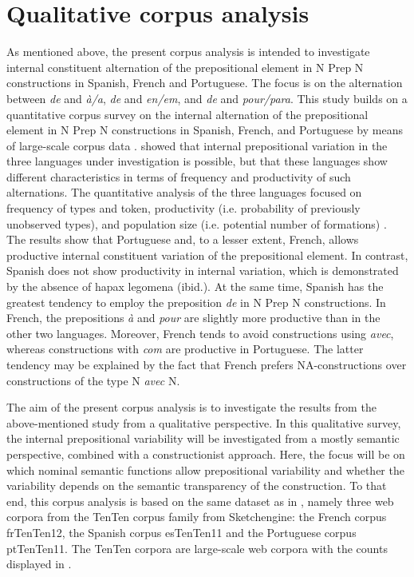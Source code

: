 \documentclass[output=paper]{langsci/langscibook}
\begin{document}
\section{Qualitative corpus analysis}
 As mentioned above, the present corpus analysis is intended to investigate internal constituent alternation of the prepositional element in N Prep N constructions in Spanish, French and Portuguese. The focus is on the alternation between \textit{de} and \textit{à/a}, \textit{de} and \textit{en/em}, and \textit{de} and \textit{pour/para}. This study builds on a quantitative corpus survey on the internal alternation of the prepositional element in N Prep N constructions in Spanish, French, and Portuguese by means of large-scale corpus data \citep{Hennecke:2017}. \citet[144]{Hennecke:2017} showed that internal prepositional variation in the three languages under investigation is possible, but that these languages show different characteristics in terms of frequency and productivity of such alternations. The quantitative analysis of the three languages focused on frequency of types and token, productivity (i.e. probability of previously unobserved types), and population size (i.e. potential number of formations) \citep[139]{Hennecke:2017}. The results show that Portuguese and, to a lesser extent, French, allows productive internal constituent variation of the prepositional element. In contrast, Spanish does not show productivity in internal variation, which is demonstrated by the absence of hapax legomena (ibid.). At the same time, Spanish has the greatest tendency to employ the preposition \textit{de} in N Prep N constructions. In French, the prepositions \textit{à} and \textit{pour} are slightly more productive than in the other two languages. Moreover, French tends to avoid constructions using \textit{avec}, whereas constructions with \textit{com} are productive in Portuguese. The latter tendency may be explained by the fact that French prefers NA-constructions over constructions of the type N \textit{avec} N.
 
The aim of the present corpus analysis is to investigate the results from the above-mentioned study from a qualitative perspective. In this qualitative survey, the internal prepositional variability will be investigated from a mostly semantic perspective, combined with a constructionist approach. Here, the focus will be on which nominal semantic functions allow prepositional variability and whether the variability depends on the semantic transparency of the construction. To that end, this corpus analysis is based on the same dataset as in \citet{Hennecke:2017}, namely three web corpora from the TenTen corpus family from Sketchengine: the French corpus frTenTen12, the Spanish corpus esTenTen11 and the Portuguese corpus ptTenTen11. The TenTen corpora are large-scale web corpora with the counts displayed in .
\end{document}
